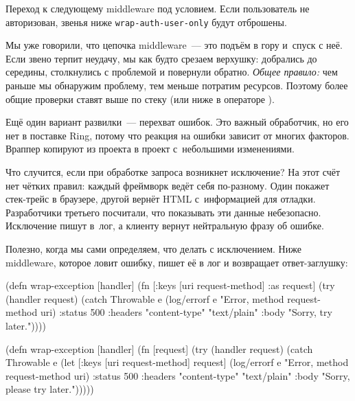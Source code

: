 \fi

Переход к следующему middleware под условием. Если пользователь не
авторизован, звенья ниже \verb|wrap-auth-user-only| будут отброшены.

Мы уже говорили, что цепочка middleware~--- это подъём в гору и~спуск с
неё. Если звено терпит неудачу, мы как будто срезаем верхушку: добрались до
середины, столкнулись с проблемой и повернули обратно. \emph{Общее правило:} чем
раньше мы обнаружим проблему, тем меньше потратим ресурсов. Поэтому более общие
проверки ставят выше по стеку (или ниже в операторе \arr).


Ещё один вариант развилки~--- перехват ошибок. Это важный обработчик, но его
нет в поставке Ring, потому что реакция на ошибки зависит от многих
факторов. Враппер копируют из проекта в проект с~небольшими изменениями.

Что случится, если при обработке запроса возникнет исключение? На этот счёт
нет чётких правил: каждый фреймворк ведёт себя по-разному. Один покажет
стек-трейс в браузере, другой вернёт HTML с~информацией для
отладки. Разработчики третьего посчитали, что показывать эти данные
небезопасно. Исключение пишут в~лог, а клиенту вернут нейтральную фразу об
ошибке.

Полезно, когда мы сами определяем, что делать с исключением. Ниже middleware,
которое ловит ошибку, пишет её в лог и возвращает ответ-заглушку:


\ifx\DEVICETYPE\MOBILE

\begin{english}
  \begin{clojure}
(defn wrap-exception [handler]
  (fn [{:keys [uri request-method]
        :as request}]
    (try
      (handler request)
      (catch Throwable e
        (log/errorf e
          "Error, method %
          request-method uri)
          {:status 500
           :headers
           {"content-type" "text/plain"}
           :body "Sorry, try later."}))))
  \end{clojure}
\end{english}

\else

\begin{english}
  \begin{clojure}
(defn wrap-exception [handler]
  (fn [request]
    (try
      (handler request)
      (catch Throwable e
        (let [{:keys [uri request-method]} request]
          (log/errorf e "Error, method %
                      request-method uri)
          {:status 500
           :headers {"content-type" "text/plain"}
           :body "Sorry, please try later."})))))
  \end{clojure}
\end{english}

